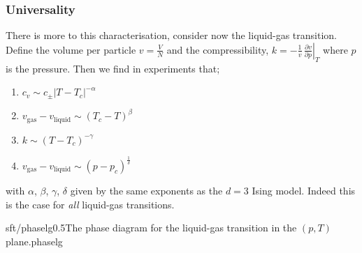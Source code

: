 \subsubsection{Universality}
There is more to this characterisation, consider now the liquid-gas transition. Define the volume per particle $v = \tfrac{V}{N}$ and the compressibility, $k = -\tfrac{1}{v} \, \left. \tfrac{\partial v}{\partial p} \right|_T$ where $p$ is the pressure. Then we find in experiments that;
\begin{enumerate}
\item $c_v \sim c_{\pm} \left| T - T_c \right|^{-\alpha}$
\item $v_{\textrm{gas}} - v_{\textrm{liquid}} \sim (T_c - T)^{\beta}$
\item $k \sim (T - T_c)^{-\gamma}$
\item $v_{\textrm{gas}} - v_{\textrm{liquid}} \sim (p - p_c)^{\tfrac{1}{\delta}}$
\end{enumerate}
with $\alpha$, $\beta$, $\gamma$, $\delta$ given by the same exponents as the $d = 3$ Ising model. Indeed this is the case for \emph{all} liquid-gas transitions.
\begin{mygraphic}{sft/phaselg}{0.5}{The phase diagram for the liquid-gas transition in the $(p, T)$ plane.}{phaselg}\end{mygraphic}
